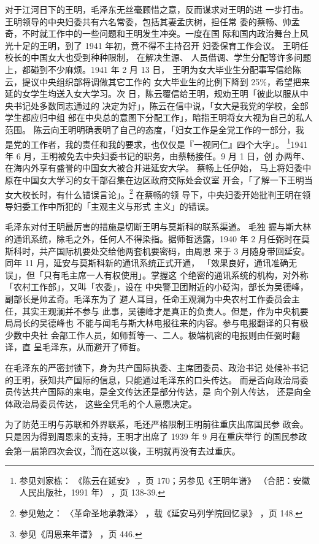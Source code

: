 对于江河日下的王明，毛泽东无丝毫顾惜之意，反而谋求对王明的进
一步打击。王明领导的中央妇委共有六名常委，包括其妻孟庆树，担任常
委的蔡畅、帅孟奇，不时就工作中的一些问题和王明发生冲突。一度在国
际和国内政治舞台上风光十足的王明，到了 1941 年初，竟不得不主持召开
妇委保育工作会议。
王明任校长的中国女大也受到种种限制，
在解决生源、
人员借调、学生分配等许多问题上，都碰到不少麻烦。1941 年 2 月 13 日，
王明为女大毕业生分配事写信给陈云，提议中央组织部将调做其它工作的
女大毕业生的比例下降到 25\%，希望把来延的女学生均送入女大学习。次
日，陈云覆信给王明，规劝王明「彼此以服从中央书记处多数同志通过的
决定为好」，陈云在信中说，「女大是我党的学校，全部学生都应归中组
部在中央总的意图下分配工作」，暗指王明将女大视为自己的私人范围。
陈云向王明明确表明了自己的态度，「妇女工作是全党工作的一部分，我
是党的工作者，我的责任和我的要求，也仅仅是『一视同仁』四个大字」。
\footnote{ 参见刘家栋：
《陈云在延安》
，页 170；另参见《王明年谱》
（合肥：安徽人民出版社，1991 年）
，页 138-39. }1941 年 6 月，王明被免去中央妇委书记的职务，由蔡畅接任。9 月 1 日，创
办两年、
在海内外享有盛誉的中国女大被合并进延安大学。
蔡畅上任伊始，
马上将妇委中原在中国女大学习的女干部召集在边区政府交际处会议室
开会，「了解一下王明当女大校长时，有什么错误言论」。\footnote{参见勉之：
〈革命圣地承教泽〉
，载《延安马列学院回忆录》
，页 148. 
} 在蔡畅的领
导下，中央妇委开始批判王明在领导妇委工作中所犯的「主观主义与形式
主义」的错误。

毛泽东对付王明最厉害的措施是切断王明与莫斯科的联系渠道。
毛独
握与斯大林的通讯系统，除毛之外，任何人不得染指。据师哲透露，1940
年 2 月任弼时在莫斯科时，共产国际机要处交给他两套机要密码，由周恩
来于 3 月随身带回延安。同年 11 月，延安与莫斯科新的通讯系统正式开通，
「效果良好，通讯准确无误」，但「只有毛主席一人有权使用」。掌握这
个绝密的通讯系统的机构，对外称「农村工作部」，又叫「农委」，设在
中央警卫团附近的小砭沟，部长为吴德峰，副部长是帅孟奇。毛泽东为了
避人耳目，任命王观澜为中央农村工作委员会主任，其实王观澜并不参与
此事，吴德峰才是真正的负责人。但是，作为中央机要局局长的吴德峰也
不能与闻毛与斯大林电报往来的内容。参与电报翻译的只有极少数中央社
会部工作人员，如师哲等一、二人。极端机密的电报则由任弼时翻译，直
呈毛泽东，从而避开了师哲。

在毛泽东的严密封锁下，身为共产国际执委、主席团委员、政治书记
处候补书记的王明，获知共产国际的信息，只能通过毛泽东的口头传达。
而是否向政治局委员传达共产国际的来电，是全文传达还是部分传达，是
向个别人传达，
还是向全体政治局委员传达，
这些全凭毛的个人意愿决定。

为了防范王明与苏联和外界联系，毛还严格限制王明前往重庆出席国民参
政会。只是因为得到周恩来的支持，王明才出席了 1939 年 9 月在重庆举行
的国民参政会第一届第四次会议，\footnote{参见《周恩来年谱》
，页 446.}而在这以後，王明就再没有去过重庆。

